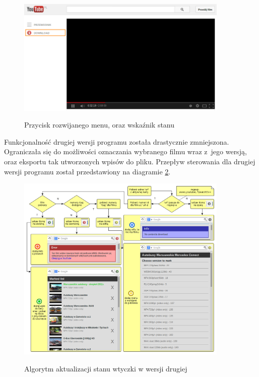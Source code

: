 \begin{figure}[h!]
    \caption{Przycisk rozwijanego menu, oraz wskaźnik stanu}
    \centering
    \includegraphics[width=0.9\textwidth]{img/env_yt_dwn_indicator}
    \label{fig:firefoxplugin1}
\end{figure}

Funkcjonalność drugiej wersji programu została drastycznie zmniejszona.
Ograniczała się do możliwości oznaczania wybranego filmu 
wraz z~jego wersją, oraz
eksportu tak utworzonych wpisów do pliku.
Przepływ sterowania dla drugiej wersji programu został przedstawiony
na diagramie \ref{fig:firefoxpluginflow}.

\begin{figure}[h!]
    \caption{Algorytm aktualizacji stanu wtyczki w wersji drugiej}
    \centering
    \includegraphics[width=0.9\textwidth]{img/env_yt_marker}
    \label{fig:firefoxpluginflow}
\end{figure}

